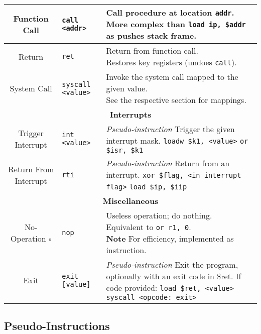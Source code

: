 \documentclass[10pt]{article}
\begin{document}
\begin{longtable}{|c|l|l|}
    \hline
    Function Call & \texttt{call <addr>} & \makecell[l]{Call procedure at location \texttt{addr}.\\%
    More complex than \texttt{load ip, \$addr} as pushes stack frame.} \\
    \hline
    Return & \texttt{ret} & \makecell[l]{Return from function call.\\%
    Restores key registers (undoes \texttt{call}).} \\
    \hline
    System Call & \texttt{syscall <value>} & \makecell[l]{Invoke the system call mapped to the given value.\\%
    See the respective section for mappings.} \\
    \hline \hline
    \multicolumn{3}{|c|}{\textbf{Interrupts}} \\
    \hline
    Trigger Interrupt & \texttt{int <value>} & \makecell[l]{\textit{Pseudo-instruction}\\%
    Trigger the given interrupt mask.\\%
    \texttt{loadw \$k1, <value>}\\%
    \texttt{or \$isr, \$k1}} \\
    \hline
    Return From Interrupt & \texttt{rti} & \makecell[l]{\textit{Pseudo-instruction}\\%
    Return from an interrupt.\\%
    \texttt{xor \$flag, <in interrupt flag>}\\
    \texttt{load \$ip, \$iip}} \\
    \hline \hline
    \multicolumn{3}{|c|}{\textbf{Miscellaneous}} \\
    \hline
    No-Operation \(\square\) & \texttt{nop} & \makecell[l]{Useless operation; do nothing.\\%
    Equivalent to \texttt{or r1, 0}.\\%
    \textbf{Note} For efficiency, implemented as instruction.} \\
    \hline
    Exit & \texttt{exit [value]} & \makecell[l]{\textit{Pseudo-instruction}\\%
    Exit the program, optionally with an exit code in \$ret.\\%
    If code provided: \texttt{load \$ret, <value>}\\%
    \texttt{syscall <opcode: exit>}} \\
    \hline
\end{longtable}

\subsection{Pseudo-Instructions}
\end{document}
